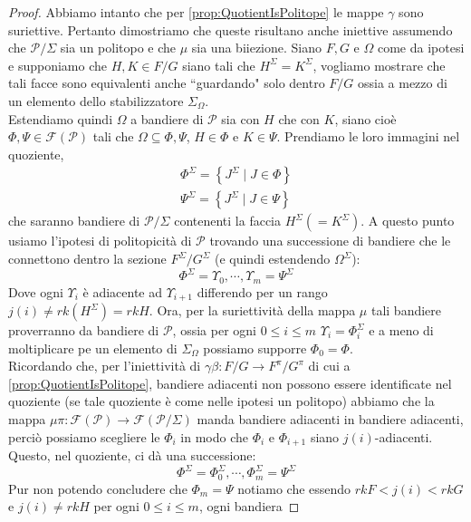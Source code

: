 \documentclass[a4paper,12pt]{report}
\newcommand{\p}{\mathcal{P}}
\theoremstyle{plain}
\theoremstyle{definition}
\newcommand\flag[1]{\mathcal{F}(#1)}
\begin{document}
\begin{proof}
Abbiamo intanto che per \ref{prop:QuotientIsPolitope} le mappe $\gamma$ sono suriettive. Pertanto dimostriamo che queste risultano anche iniettive
assumendo che $\p/\Sigma$ sia un politopo e che $\mu$ sia una biiezione.
Siano $F,G$ e $\Omega$ come da ipotesi e supponiamo che $H,K\in F/G$ siano tali che $H^\Sigma=K^\Sigma$, vogliamo mostrare che tali facce
sono equivalenti anche ``guardando" solo dentro $F/G$ ossia a mezzo di un elemento dello stabilizzatore $\Sigma_\Omega$.\\
Estendiamo quindi $\Omega$ a bandiere di $\p$ sia con $H$ che con $K$, siano cio\`e $\Phi,\Psi\in\flag{\p}$ tali che
$\Omega\subseteq\Phi,\Psi$, $H\in\Phi$ e $K\in\Psi$. Prendiamo le loro immagini nel quoziente,
\begin{gather*}
\Phi^\Sigma=\left\{J^\Sigma\mid J\in\Phi\right\}\\
\Psi^\Sigma=\left\{J^\Sigma\mid J\in\Psi\right\}
\end{gather*}
che saranno bandiere di $\p/\Sigma$ contenenti la faccia $H^\Sigma(=K^\Sigma)$. A questo punto usiamo l'ipotesi di politopicit\`a di $\p$ trovando
una successione di bandiere che le connettono dentro la sezione $F^\Sigma/G^\Sigma$ (e quindi estendendo $\Omega^\Sigma$):
\begin{equation*}
\Phi^\Sigma=\Upsilon_0,\cdots,\Upsilon_m=\Psi^\Sigma
\end{equation*}
Dove ogni $\Upsilon_i$ \`e adiacente ad $\Upsilon_{i+1}$ differendo per un rango $j(i)\neq rk(H^\Sigma)=rkH$. Ora, per la suriettivit\`a della mappa
$\mu$ tali bandiere proverranno da bandiere di $\p$, ossia per ogni $0\leq i\leq m$ $\Upsilon_i=\Phi_i^\Sigma$ e a meno di moltiplicare pe un elemento
di $\Sigma_\Omega$ possiamo supporre $\Phi_0=\Phi$.\\
Ricordando che, per l'iniettivit\`a di $\gamma\beta:F/G\longrightarrow F^\pi/G^\pi$ di cui a \ref{prop:QuotientIsPolitope}, bandiere adiacenti
non possono essere identificate nel quoziente (se tale quoziente \`e come nelle ipotesi un politopo) abbiamo che la mappa
$\mu\pi:\flag{\p}\longrightarrow\flag{\p/\Sigma}$ manda bandiere adiacenti in bandiere adiacenti, perci\`o possiamo scegliere le $\Phi_i$ in modo
che $\Phi_{i}$ e $\Phi_{i+1}$ siano $j(i)$-adiacenti. Questo, nel quoziente, ci d\`a una successione:
\begin{equation*}
\Phi^\Sigma=\Phi_0^\Sigma,\cdots,\Phi_m^\Sigma=\Psi^\Sigma
\end{equation*}
Pur non potendo concludere che $\Phi_m=\Psi$ notiamo che essendo $rkF<j(i)<rkG$ e $j(i)\neq rkH$ per ogni $0\leq i\leq m$, ogni bandiera

\end{proof}
\end{document}
